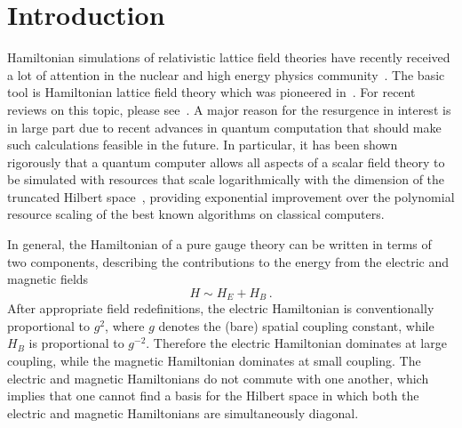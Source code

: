 \documentclass[reprint,superscriptaddress,pra,nofootinbib,preprintnumbers,floatfix]{revtex4-1}
\begin{document}
\section{Introduction}

Hamiltonian simulations of relativistic lattice field theories have recently received a lot of attention in the nuclear and high energy physics community~\cite{Mil:2019pbt,Yang:2020yer,Zhou:2021kdl,Gorg:2018xyc,Stannigel:2013zka,Zohar:2012xf,Mezzacapo:2015bra,Bazavov:2015kka,Yang:2016hjn,Gonzalez-Cuadra:2017lvz,Davoudi:2019bhy,Surace:2019dtp,Luo:2019vmi,Banerjee:2012pg,Ott:2020ycj,Dasgupta:2020itb,Osborne:2022jxq,Tagliacozzo:2012df,Zohar:2013zla,Hauke:2013jga,Kuhn:2014rha,Kasper:2015cca,Zohar:2015hwa,Alexandru:2019nsa,Klco:2019evd,Davoudi:2020yln,Haase:2020kaj,Kreshchuk:2020dla,Ciavarella:2021nmj,Buser:2020cvn,Ciavarella:2021nmj,Bauer:2021gek,Byrnes:2005qx,Grabowska:2022uos,Kane:2022ejm,Anishetty:2009nh,Banuls:2017ena,Kaplan:2018vnj,Zohar:2019ygc,Raychowdhury:2018osk,Raychowdhury:2019iki,Stryker:2021asy,Davoudi:2022xmb,Barata:2020jtq,Shaw:2020udc,Kan:2021xfc,Lamm:2019bik,ARahman:2022tkr,ARahman:2021ktn,Martinez:2016yna,Nguyen:2021hyk,Klco:2018kyo,Kokail:2018eiw,Nagano:2023uaq}. The basic tool is Hamiltonian lattice field theory which was pioneered in~\cite{Kogut:1974ag,Banks:1975gq}.
%
For recent reviews on this topic, please see~\cite{Banuls:2019bmf,Kasper:2020akk,Aidelsburger:2021mia,Klco:2021lap,Bauer:2022hpo}.
%
A major reason for the resurgence in interest is in large part due to recent advances in quantum computation that should make such calculations feasible in the future.
%
In particular, it has been shown rigorously that a quantum computer allows all aspects of a scalar field theory to be simulated with resources that scale logarithmically with the dimension of the truncated Hilbert space~\cite{Jordan:2011ci,Jordan:2012xnu}, providing exponential improvement over the polynomial resource scaling of the best known algorithms on classical computers.



In general, the Hamiltonian of a pure gauge theory can be written in terms of two components, describing the contributions to the energy from the electric and magnetic fields
%
\begin{equation}
    H \sim H_E + H_B \,.
\end{equation}
%
After appropriate field redefinitions, the electric Hamiltonian is conventionally proportional to $g^2$, where $g$ denotes the (bare) spatial coupling constant, while $H_B$ is proportional to $g^{-2}$. 
%
Therefore the electric Hamiltonian dominates at large coupling, while the magnetic Hamiltonian dominates at small coupling. 
%
The electric and magnetic Hamiltonians do not commute with one another, which implies that one cannot find a basis for the Hilbert space in which both the electric and magnetic Hamiltonians are simultaneously diagonal.
\end{document}
